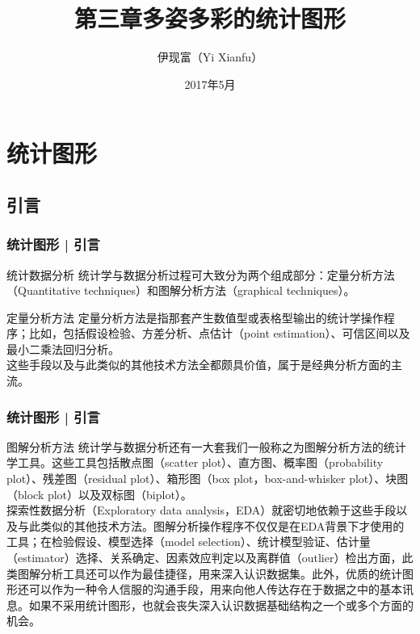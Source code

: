 



\title[统计图形]{第三章\quad 多姿多彩的统计图形}
\author[Yixf]{伊现富（Yi Xianfu）}
\date{2017年5月}




\section{统计图形}
\subsection{引言}
\begin{frame}
  \frametitle{统计图形 | 引言}
  \begin{block}{统计数据分析}
    统计学与数据分析过程可大致分为两个组成部分：定量分析方法（Quantitative techniques）和图解分析方法（graphical techniques）。
  \end{block}
  \pause
  \begin{block}{定量分析方法}
    定量分析方法是指那套产生数值型或表格型输出的统计学操作程序；比如，包括假设检验、方差分析、点估计（point estimation）、可信区间以及最小二乘法回归分析。\\
    \vspace{0.5em}
    这些手段以及与此类似的其他技术方法全都颇具价值，属于是经典分析方面的主流。
  \end{block}
\end{frame}

\begin{frame}
  \frametitle{统计图形 | 引言}
  \begin{block}{图解分析方法}
统计学与数据分析还有一大套我们一般称之为图解分析方法的统计学工具。这些工具包括散点图（scatter plot）、直方图、概率图（probability plot）、残差图（residual plot）、箱形图（box plot，box-and-whisker plot）、块图（block plot）以及双标图（biplot）。\\
\vspace{0.5em}
探索性数据分析（Exploratory data analysis，EDA）就密切地依赖于这些手段以及与此类似的其他技术方法。图解分析操作程序不仅仅是在EDA背景下才使用的工具；在检验假设、模型选择（model selection）、统计模型验证、估计量（estimator）选择、关系确定、因素效应判定以及离群值（outlier）检出方面，此类图解分析工具还可以作为最佳捷径，用来深入认识数据集。此外，优质的统计图形还可以作为一种令人信服的沟通手段，用来向他人传达存在于数据之中的基本讯息。如果不采用统计图形，也就会丧失深入认识数据基础结构之一个或多个方面的机会。
  \end{block}
\end{frame}

